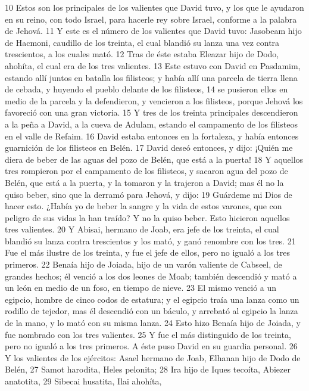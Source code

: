 10 Estos son los principales de los valientes que David tuvo, y los que le ayudaron en su reino, con todo Israel, para hacerle rey sobre Israel, conforme a la palabra de Jehová.
11 Y este es el número de los valientes que David tuvo: Jasobeam hijo de Hacmoni, caudillo de los treinta, el cual blandió su lanza una vez contra trescientos, a los cuales mató.
12 Tras de éste estaba Eleazar hijo de Dodo, ahohíta, el cual era de los tres valientes.
13 Este estuvo con David en Pasdamim, estando allí juntos en batalla los filisteos; y había allí una parcela de tierra llena de cebada, y huyendo el pueblo delante de los filisteos,
14 se pusieron ellos en medio de la parcela y la defendieron, y vencieron a los filisteos, porque Jehová los favoreció con una gran victoria.
15 Y tres de los treinta principales descendieron a la peña a David, a la cueva de Adulam, estando el campamento de los filisteos en el valle de Refaim.
16 David estaba entonces en la fortaleza, y había entonces guarnición de los filisteos en Belén.
17 David deseó entonces, y dijo: ¡Quién me diera de beber de las aguas del pozo de Belén, que está a la puerta!
18 Y aquellos tres rompieron por el campamento de los filisteos, y sacaron agua del pozo de Belén, que está a la puerta, y la tomaron y la trajeron a David; mas él no la quiso beber, sino que la derramó para Jehová, y dijo:
19 Guárdeme mi Dios de hacer esto. ¿Había yo de beber la sangre y la vida de estos varones, que con peligro de sus vidas la han traído? Y no la quiso beber. Esto hicieron aquellos tres valientes.
20 Y Abisai, hermano de Joab, era jefe de los treinta, el cual blandió su lanza contra trescientos y los mató, y ganó renombre con los tres.
21 Fue el más ilustre de los treinta, y fue el jefe de ellos, pero no igualó a los tres primeros.
22 Benaía hijo de Joiada, hijo de un varón valiente de Cabseel, de grandes hechos; él venció a los dos leones de Moab; también descendió y mató a un león en medio de un foso, en tiempo de nieve.
23 El mismo venció a un egipcio, hombre de cinco codos   de estatura; y el egipcio traía una lanza como un rodillo de tejedor, mas él descendió con un báculo, y arrebató al egipcio la lanza de la mano, y lo mató con su misma lanza.
24 Esto hizo Benaía hijo de Joiada, y fue nombrado con los tres valientes.
25 Y fue el más distinguido de los treinta, pero no igualó a los tres primeros. A éste puso David en su guardia personal.
26 Y los valientes de los ejércitos: Asael hermano de Joab, Elhanan hijo de Dodo de Belén,
27 Samot harodita, Heles pelonita;
28 Ira hijo de Iques tecoíta, Abiezer anatotita,
29 Sibecai husatita, Ilai ahohíta,
